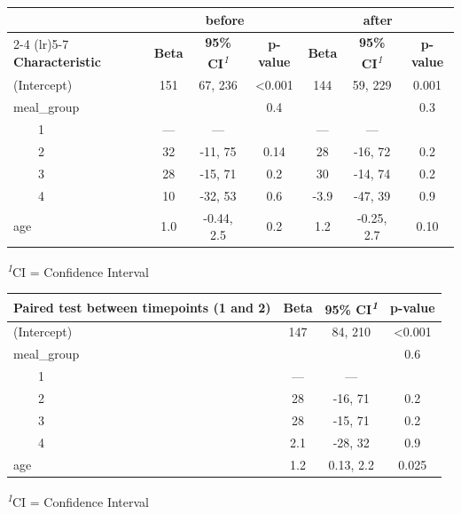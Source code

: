 \documentclass[
]{article}
\begin{document}
\begin{table}
\fontsize{12.0pt}{14.4pt}\selectfont
\begin{tabular*}{\linewidth}{@{\extracolsep{\fill}}lcccccc}
\toprule
 & \multicolumn{3}{c}{\textbf{before}} & \multicolumn{3}{c}{\textbf{after}} \\ 
\cmidrule(lr){2-4} \cmidrule(lr){5-7}
\textbf{Characteristic} & \textbf{Beta} & \textbf{95\% CI}\textsuperscript{\textit{1}} & \textbf{p-value} & \textbf{Beta} & \textbf{95\% CI}\textsuperscript{\textit{1}} & \textbf{p-value} \\ 
\midrule\addlinespace[2.5pt]
(Intercept) & 151 & 67, 236 & <0.001 & 144 & 59, 229 & 0.001 \\ 
meal\_group &  &  & 0.4 &  &  & 0.3 \\ 
    1 & — & — &  & — & — &  \\ 
    2 & 32 & -11, 75 & 0.14 & 28 & -16, 72 & 0.2 \\ 
    3 & 28 & -15, 71 & 0.2 & 30 & -14, 74 & 0.2 \\ 
    4 & 10 & -32, 53 & 0.6 & -3.9 & -47, 39 & 0.9 \\ 
age & 1.0 & -0.44, 2.5 & 0.2 & 1.2 & -0.25, 2.7 & 0.10 \\ 
\bottomrule
\end{tabular*}
\begin{minipage}{\linewidth}
\textsuperscript{\textit{1}}CI = Confidence Interval\\
\end{minipage}
\end{table}

\begin{table}
\fontsize{12.0pt}{14.4pt}\selectfont
\begin{tabular*}{\linewidth}{@{\extracolsep{\fill}}lccc}
\toprule
\textbf{Paired test between timepoints (1 and 2)} & \textbf{Beta} & \textbf{95\% CI}\textsuperscript{\textit{1}} & \textbf{p-value} \\ 
\midrule\addlinespace[2.5pt]
(Intercept) & 147 & 84, 210 & <0.001 \\ 
meal\_group &  &  & 0.6 \\ 
    1 & — & — &  \\ 
    2 & 28 & -16, 71 & 0.2 \\ 
    3 & 28 & -15, 71 & 0.2 \\ 
    4 & 2.1 & -28, 32 & 0.9 \\ 
age & 1.2 & 0.13, 2.2 & 0.025 \\ 
\bottomrule
\end{tabular*}
\begin{minipage}{\linewidth}
\textsuperscript{\textit{1}}CI = Confidence Interval\\
\end{minipage}
\end{table}
\end{document}
